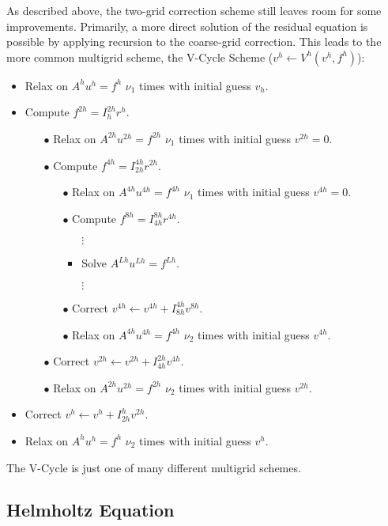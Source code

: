 \documentclass[]{article}
\theoremstyle{definition}
\begin{document}
As described above, the two-grid correction scheme still leaves room for some improvements.  Primarily, a more direct solution of the residual equation is possible by applying recursion to the coarse-grid correction.  This leads to the more common multigrid scheme, the V-Cycle Scheme ($v^h \leftarrow V^h (v^h, f^h)$):
\begin{itemize}
\item Relax on $A^h u^h = f^h$ $\nu_1$ times with initial guess $v_h$.
\item Compute $f^{2h} = I^{2h}_h r^h$.
	\begin{itemize}
	\item[$\bullet$] Relax on $A^{2h} u^{2h} = f^{2h}$ $\nu_1$ times with initial guess $v^{2h} = 0$.
	\item[$\bullet$] Compute $f^{4h} = I^{4h}_{2h} r^{2h}$.
		\begin{itemize}
		\item[$\bullet$] Relax on $A^{4h} u^{4h} = f^{4h}$ $\nu_1$ times with initial guess $v^{4h} = 0$.
		\item[$\bullet$] Compute $f^{8h} = I^{8h}_{4h} r^{4h}$.
			\begin{itemize}
				\item[$\vdots$]
				\item Solve $A^{Lh} u^{Lh} = f^{Lh}$.
				\item[$\vdots$]
			\end{itemize}
		\item[$\bullet$] Correct $v^{4h} \leftarrow v^{4h} + I^{4h}_{8h} v^{8h}$.
		\item[$\bullet$] Relax on $A^{4h} u^{4h} = f^{4h}$ $\nu_2$ times with initial guess $v^{4h}$.
		\end{itemize}
	\item[$\bullet$] Correct $v^{2h} \leftarrow v^{2h} + I^{2h}_{4h} v^{4h}$.
	\item[$\bullet$] Relax on $A^{2h} u^{2h} = f^{2h}$ $\nu_2$ times with initial guess $v^{2h}$.
	\end{itemize}
\item Correct $v^{h} \leftarrow v^{h} + I^{h}_{2h} v^{2h}$.
\item Relax on $A^{h} u^{h} = f^{h}$ $\nu_2$ times with initial guess $v^{h}$.
\end{itemize}

The V-Cycle is just one of many different multigrid schemes.

\subsection{Helmholtz Equation}
\end{document}
